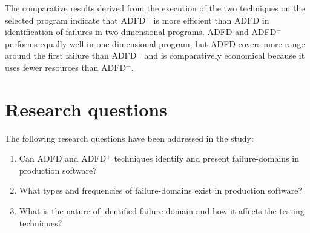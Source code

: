 The comparative results derived from the execution of the two techniques on the selected program indicate that ADFD$^+$ is more efficient than ADFD in identification of failures in two-dimensional programs. ADFD and ADFD$^+$ performs equally well in one-dimensional program, but ADFD covers more range around the first failure than ADFD$^+$ and is comparatively economical because it uses fewer resources than ADFD$^+$.


\section{Research questions} \label{sec:questions}
The following research questions have been addressed in the study:
\begin{enumerate}
%
\item Can ADFD and ADFD$^+$ techniques identify and present failure-domains in production software? %

%
%
\item What types and frequencies of failure-domains exist in production software? %
%
\item What is the nature of identified failure-domain and how it affects the testing techniques? %


\end{enumerate}
